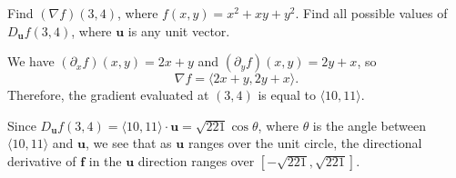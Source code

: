 \documentclass{watsonbook}
\begin{document}
  \begin{example}{}{}
    Find $(\nabla f)(3,4)$, where $f(x,y) = x^2 + xy + y^2$. Find all
    possible values of $D_{\mathbf{u}}f(3,4)$, where $\mathbf{u}$ is
    any unit vector. 
  \end{example}

  \begin{solution}
    We have $(\partial_xf)(x,y)= 2x + y$ and $(\partial_y f)(x,y) = 2y
    + x$, so
    \[
      \nabla f = \langle 2x + y, 2y + x \rangle. 
    \]
    Therefore, the gradient evaluated at $(3,4)$ is equal to
    $\boxed{\langle 10,11\rangle}$.

    Since  $D_{\mathbf{u}}f(3,4) = \langle 10,11\rangle \cdot
    \mathbf{u} = \sqrt{221}\cos\theta$, where $\theta$ is the angle
    between $\langle 10,11\rangle$ and $\mathbf{u}$, we see that as
    $\mathbf{u}$ ranges over the unit circle, the directional
    derivative of $\mathbf{f}$ in the $\mathbf{u}$ direction ranges
    over $\boxed{[-\sqrt{221}, \sqrt{221}]}$.  
  \end{solution}
\end{document}

